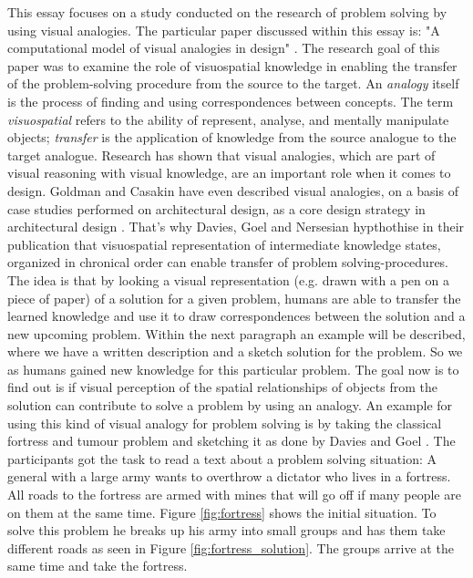 \documentclass[12pt]{article}
\begin{document}
\noindent This essay focuses on a study conducted on the research of problem solving by using visual analogies. The particular paper discussed within this essay is: "A computational model of visual analogies in design" \cite{davies2009computational}. The research goal of this paper was to examine the role of visuospatial knowledge in enabling the transfer of the problem-solving procedure from the source to the target.
An \textit{analogy} itself is the process of finding and using correspondences between concepts. The term \textit{visuospatial} refers to the ability of represent, analyse, and mentally manipulate objects; \textit{transfer} is the application of knowledge from the source analogue to the target analogue. Research has shown that visual analogies, which are part of visual reasoning with visual knowledge, are an important role when it comes to design. Goldman and Casakin have even described visual analogies, on a basis of case studies performed on architectural design, as a core design strategy in architectural design \cite{casakin1999expertise}. That's why Davies, Goel and Nersesian hypthothise in their publication that visuospatial representation of intermediate knowledge states, organized in chronical order can enable transfer of problem solving-procedures. The idea is that by looking a visual representation (e.g. drawn with a pen on a piece of paper) of a solution for a given problem, humans are able to transfer the learned knowledge and use it to draw correspondences between the solution and a new upcoming problem. Within the next paragraph an example will be described, where we have a written description and a sketch solution for the problem. So we as humans gained new knowledge for this particular problem. The goal now is to find out is if visual perception of the spatial relationships of objects from the solution can contribute to solve a 
problem by using an analogy. An example for using this kind of visual analogy for problem solving is by taking the classical fortress and tumour problem \cite{duncker1926qualitative} and sketching it as done by Davies and Goel \cite{davies2001visual}. The participants got the task to read a text about a problem solving situation: A general with a large army wants to overthrow a dictator who lives in a fortress. All roads to the fortress are armed with mines that will go off if many people are on them at the same time. Figure \ref{fig:fortress} shows the initial situation. To solve this problem he breaks up his army into small groups and has them take different roads as seen in Figure \ref{fig:fortress_solution}. The groups arrive at the same time and take the fortress.  
\end{document}
